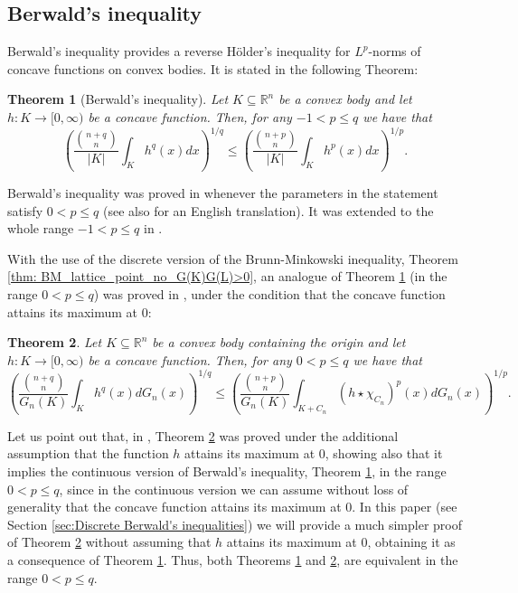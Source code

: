 \documentclass{amsart}
\newcommand{\R}{\mathbb R}
\newtheorem{thm}{Theorem}[section]
\theoremstyle{remark}
\theoremstyle{definition}
\numberwithin{equation}{section}
\begin{document}
\subsection{Berwald's inequality}\label{sec:Berwald}

Berwald's inequality provides a reverse H\"older's inequality for $L^p$-norms of concave functions on convex bodies. It is stated in the following Theorem:

\begin{thm}[Berwald's inequality]\label{thm:Berwald}
Let $K\subseteq\R^n$ be a convex body and let $h:K\to[0,\infty)$ be a concave function. Then, for any $-1<p\leq q$ we have that
$$
\left(\frac{{{n+q}\choose{n}}}{|K|}\int_K h^q(x)dx\right)^{1/q}\leq\left(\frac{{{n+p}\choose{n}}}{|K|}\int_K h^p(x)dx\right)^{1/p}.
$$
\end{thm}

Berwald's inequality was proved in \cite[Satz 7]{Be} whenever the parameters in the statement satisfy $0<p\leq q$ (see also \cite[Thm. 7.2]{AAGJV} for an English translation). It was extended to the whole range $-1<p\leq q$ in \cite[Thm. 5.1]{GZ}.

With the use of the discrete version of the Brunn-Minkowski inequality, Theorem \ref{thm: BM_lattice_point_no_G(K)G(L)>0}, an analogue of Theorem \ref{thm:Berwald} (in the range $0<p\leq q$) was proved in \cite[Thm. 1.4]{ALY}, under the condition that the concave function attains its maximum at 0:

\begin{thm}\label{thm:BerwaldDiscreteNew}
Let $K\subseteq\R^n$ be a convex body containing the origin and let $h:K\to[0,\infty)$ be a concave function. Then, for any $0<p\leq q$ we have that
$$
\left(\frac{{{n+q}\choose{n}}}{G_n(K)}\int_K h^q(x)dG_n(x)\right)^{1/q}\leq\left(\frac{{{n+p}\choose{n}}}{G_n(K)}\int_{K+C_n} (h\star\chi_{C_n})^p(x)dG_n(x)\right)^{1/p}.
$$
\end{thm}

Let us point out that, in \cite[Thms. 1.4 and 4.5]{ALY}, Theorem \ref{thm:BerwaldDiscreteNew} was proved under the additional assumption that the function $h$ attains its maximum at $0$, showing also that it implies the continuous version of Berwald's inequality, Theorem \ref{thm:Berwald}, in the range $0<p\leq q$, since in the continuous version we can assume without loss of generality that the concave function attains its maximum at 0. In this paper (see Section \ref{sec:Discrete Berwald's inequalities}) we will provide a much simpler proof of Theorem \ref{thm:BerwaldDiscreteNew} without assuming that $h$ attains its maximum at $0$, obtaining it as a consequence of Theorem \ref{thm:Berwald}. Thus, both Theorems \ref{thm:Berwald} and \ref{thm:BerwaldDiscreteNew}, are equivalent in the range $0<p\leq q$.
\end{document}
